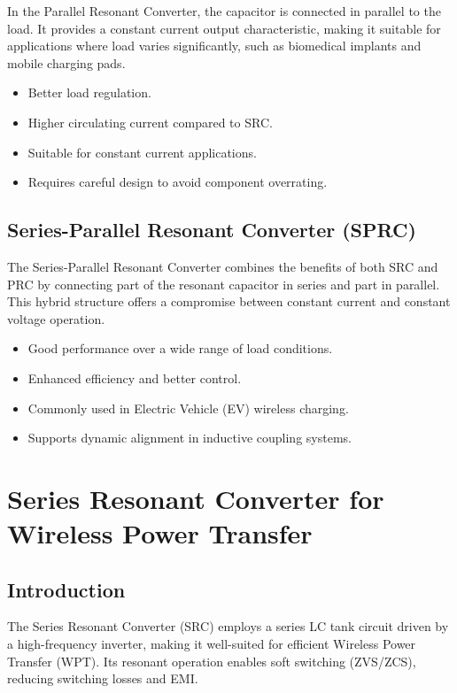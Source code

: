 \documentclass[12pt,a4paper]{report}
\begin{document}
\quad In the Parallel Resonant Converter, the capacitor is connected in parallel to the load. It provides a constant current output characteristic, making it suitable for applications where load varies significantly, such as biomedical implants and mobile charging pads.\cite{choi2020resonant}\cite{bertolini2021frequency}

\begin{itemize}
    \item Better load regulation.
    \item Higher circulating current compared to SRC.
    \item Suitable for constant current applications.
    \item Requires careful design to avoid component overrating.
\end{itemize}

\section{Series-Parallel Resonant Converter (SPRC)}

\quad The Series-Parallel Resonant Converter combines the benefits of both SRC and PRC by connecting part of the resonant capacitor in series and part in parallel. This hybrid structure offers a compromise between constant current and constant voltage operation.\cite{lin2021analysis}\cite{li2022singleended}

\begin{itemize}
    \item Good performance over a wide range of load conditions.
    \item Enhanced efficiency and better control.
    \item Commonly used in Electric Vehicle (EV) wireless charging.
    \item Supports dynamic alignment in inductive coupling systems.
\end{itemize}



\chapter{Series Resonant Converter for Wireless Power Transfer}
\vspace{1cm}
\section{Introduction}
\quad The Series Resonant Converter (SRC) employs a series LC tank circuit driven by a high-frequency inverter, making it well-suited for efficient Wireless Power Transfer (WPT). Its resonant operation enables soft switching (ZVS/ZCS), reducing switching losses and EMI.\cite{li2022singleended}\cite{erickson2020resonant}
\end{document}
